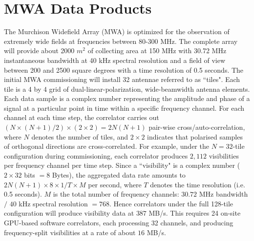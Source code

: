 \documentclass[11pt,twoside]{article}
\begin{document}
\section{MWA Data Products}
The Murchison Widefield Array (MWA) is optimized for the observation of extremely wide fields at frequencies between 80-300 MHz. %
The complete array will provide about 2000 $m^2$ of collecting area at 150 MHz with 30.72 MHz instantaneous bandwidth at 40 kHz spectral resolution and a field of view between 200 and 2500 square degrees with %
a time resolution of 0.5 seconds. The initial MWA commissioning will install 32 antennae referred to as ``tiles". Each tile is a 4 by 4 grid of dual-linear-polarization, wide-beamwidth antenna elements. Each data sample is a complex number representing the amplitude and phase of a signal at a particular point in time within a specific frequency channel. For each channel at each time step, the correlator carries out \((N \times (N + 1) / 2) \times (2  \times 2) = 2N(N+1) \) pair-wise cross/auto-correlation, where \(N\) denotes the number of tiles, and \(2 \times 2 \) indicates that polarised samples of orthogonal directions are cross-correlated. For example,  under the \(N=32\)-tile configuration during commissioning, each correlator produces \(2,112\) visibilities per frequency channel per time step. %
Since a ``visibility" is a complex number (\(2 \times 32\) bits \(= 8\) Bytes), the aggregated data rate amounts to \( 2N(N+1) \times 8 \times 1/T \times M\) per second, where \(T\) denotes the time resolution (i.e. 0.5 seconds). \(M\) is the total number of frequency channels: \(30.72\) MHz bandwidth \(/\) \(40\) kHz spectral resolution \(= 768\). Hence correlators under the full 128-tile configuration will produce visibility data at \(387\) MB/s. This requires 24 on-site GPU-based software correlators, each processing 32 channels, and producing frequency-split visibilities at a rate of about \(16\) MB/s. 
\end{document}
